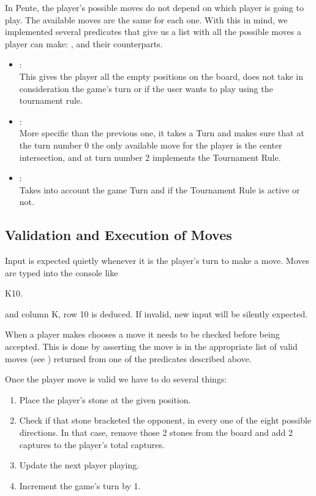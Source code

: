 \documentclass[12pt,a4paper,notitlepage]{article}
\begin{document}
In Pente, the player's possible moves do not depend on which player is going to play. The available moves are the same for each one.
With this in mind, we implemented several predicates that give us a list with all the possible moves a player can make: ,  and their  counterparts.

\begin{itemize}[noitemsep]
\item {}: \\
This gives the player all the empty positions on the board, does not take in consideration the game's turn or if the user wants to play using the tournament rule.
\item {}: \\
More specific than the previous one, it takes a Turn and makes sure that at the turn number 0 the only available move for the player is the center intersection, and at turn number 2 implements the Tournament Rule.
\item {}: \\
Takes into account the game Turn and if the Tournament Rule is active or not.
\end{itemize}

\subsection{Validation and Execution of Moves}
\label{subsec:moves}

Input is expected quietly whenever it is the player's turn to make a move.
Moves are typed into the console like
\begin{center}
	\ttfamily K10.
\end{center}
and column K, row 10 is deduced. If invalid, new input will be silently expected.

When a player makes chooses a move it needs to be checked before being accepted. This is done by asserting the move is in the appropriate list of valid moves (see ) returned from one of the predicates described above.

Once the player move is valid we have to do several things:

\begin{enumerate}[noitemsep,label=(\roman*)]
	\item Place the player's stone at the given position.
	\item Check if that stone bracketed the opponent, in every one of the eight possible directions. In that case, remove those 2 stones from the board and add 2 captures to the player's total captures.
	\item Update the next player playing.
	\item Increment the game's turn by 1.
\end{enumerate}
\end{document}
